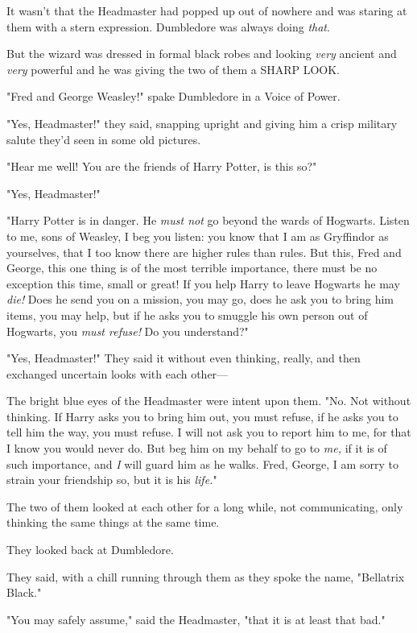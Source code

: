 It wasn't that the Headmaster had popped up out of nowhere and was staring at
them with a stern expression. Dumbledore was always doing \emph{that}.

But the wizard was dressed in formal black robes and looking \emph{very}
ancient and \emph{very} powerful and he was giving the two of them a SHARP LOOK.

"Fred and George Weasley!" spake Dumbledore in a Voice of Power.

"Yes, Headmaster!" they said, snapping upright and giving him a crisp military
salute they'd seen in some old pictures.

"Hear me well! You are the friends of Harry Potter, is this so?"

"Yes, Headmaster!"

"Harry Potter is in danger. He \emph{must not} go beyond the wards of Hogwarts.
Listen to me, sons of Weasley, I beg you listen: you know that I am as
Gryffindor as yourselves, that I too know there are higher rules than rules.
But this, Fred and George, this one thing is of the most terrible importance,
there must be no exception this time, small or great! If you help Harry to
leave Hogwarts he may \emph{die!} Does he send you on a mission, you may go,
does he ask you to bring him items, you may help, but if he asks you to smuggle
his own person out of Hogwarts, you \emph{must refuse!} Do you understand?"

"Yes, Headmaster!" They said it without even thinking, really, and then
exchanged uncertain looks with each other—

The bright blue eyes of the Headmaster were intent upon them. "No. Not without
thinking. If Harry asks you to bring him out, you must refuse, if he asks you
to tell him the way, you must refuse. I will not ask you to report him to me,
for that I know you would never do. But beg him on my behalf to go to
\emph{me,} if it is of such importance, and \emph{I} will guard him as he
walks. Fred, George, I am sorry to strain your friendship so, but it is his
\emph{life.}"

The two of them looked at each other for a long while, not communicating, only
thinking the same things at the same time.

They looked back at Dumbledore.

They said, with a chill running through them as they spoke the name, "Bellatrix
Black."

"You may safely assume," said the Headmaster, "that it is at least that bad."

